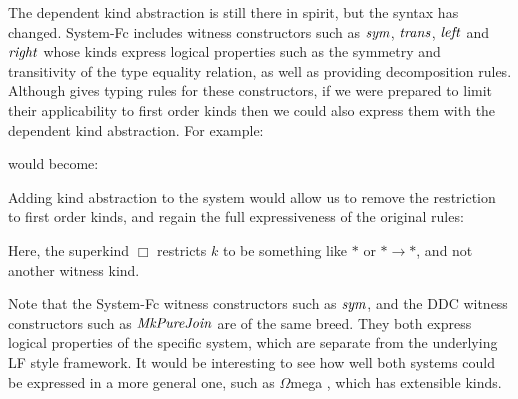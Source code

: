 \code{
	$\ielemList \ \iInt :: \iElem \ [\iInt] \sim \iInt$
}

The dependent kind abstraction is still there in spirit, but the syntax has changed. System-Fc includes witness constructors such as $\operatorname{\mathit{sym}}$, $\operatorname{\mathit{trans}}$, $\operatorname{\mathit{left}}$ and $\operatorname{\mathit{right}}$ whose kinds express logical properties such as the symmetry and transitivity of the type equality relation, as well as providing decomposition rules. Although \cite{sulzmann:system-Fc} gives typing rules for these constructors, if we were prepared to limit their applicability to first order kinds then we could also express them with the dependent kind abstraction. For example:

would become:


Adding kind abstraction to the system would allow us to remove the restriction to first order kinds, and regain the full expressiveness of the original rules:


Here, the superkind $\Box$ restricts $k$ to be something like $*$ or $* \to *$, and not another witness kind. 

Note that the System-Fc witness constructors such as $\operatorname{\mathit{sym}}$, and the DDC witness constructors such as $\operatorname{\mathit{MkPureJoin}}$ are of the same breed. They both express logical properties of the specific system, which are separate from the underlying LF \cite{avron:edinburgh-lf} style framework. It would be interesting to see how well both systems could be expressed in a more general one, such as $\Omega$mega \cite{sheard:curry-howard}, which has extensible kinds.



